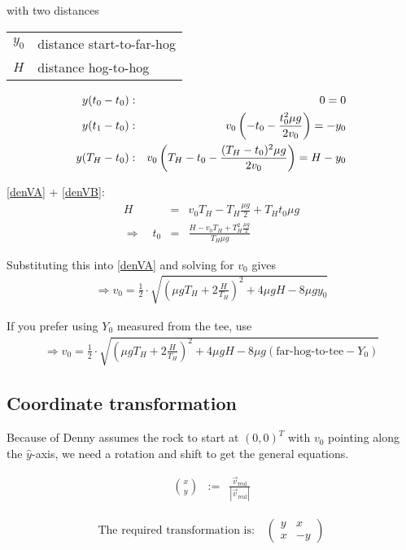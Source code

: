 \noindent
with two distances

\medskip
\begin{tabular}{l@{ : }l}
$y_0$ & distance start-to-far-hog \\
$H  $ & distance hog-to-hog
\end{tabular}
\medskip

\begin{eqnarray}
y(t_0 - t_0) &:& 0 = 0 \\
\eqlab{denVA}
y(t_1 - t_0) &:& v_0 \left(-t_0 - \frac{t_0^2 \mu g}{2 v_0}\right) = -y_0 \\
\eqlab{denVB}
y(T_H - t_0) &:& v_0 \left(T_H-t_0 - \frac{(T_H-t_0)^2\mu g}{2v_0}\right) = H-y_0 
\end{eqnarray}

\eqref{denVA} + \eqref{denVB}:
\begin{eqnarray}
H &=& v_0 T_H - T_H\frac{\mu g}{2} + T_H t_0 \mu g \\
\Longrightarrow\quad
t_0 &=& \frac{H - v_0 T_H + T_H^2\frac{\mu g}{2}}{ T_H \mu g }
\end{eqnarray}

Substituting this into \eqref{denVA} and solving for $v_0$ gives
\begin{eqnarray}
\Longrightarrow v_0 =  \frac{1}{2}\cdot 
    \sqrt{
	\left(\mu g T_H + 2\frac{H}{T_H}\right)^2 +
	4 \mu g H - 
	8 \mu g y_0
    }
\end{eqnarray}

If you prefer using $Y_0$ measured from the tee, use
\begin{eqnarray}
\Longrightarrow v_0 =  \frac{1}{2}\cdot 
    \sqrt{
	\left(\mu g T_H + 2\frac{H}{T_H}\right)^2 + 
	4 \mu g H - 
	8 \mu g (\mbox{far-hog-to-tee} - Y_0)
    }
\end{eqnarray}

\subsection{Coordinate transformation}

Because of Denny assumes the rock to start at
$(0,0)^T$ with $v_0$ pointing along the $\hat{y}$-axis, we need a
rotation and shift to get the general equations.

\begin{eqnarray}
{x \choose y} &:=& \frac{ \vec{v}_\mathrm{real} }{ | \vec{v}_\mathrm{real} | }
\end{eqnarray}

\begin{eqnarray}
\mbox{The required transformation is:}\quad
\left(\begin{array}{cc}
 y &  x \\
 x & -y
\end{array}\right)
\end{eqnarray}

